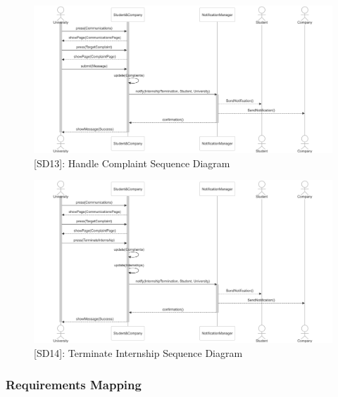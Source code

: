 \begin{figure}
    \centering
    \includegraphics[width=1\textwidth]{Latex/Images/RASD/SequenceDiagrams/HandleComplaintSequenceDiagram.png}
    \caption{[SD13]: Handle Complaint Sequence Diagram}
    \label{fig:SD13}
\end{figure}

\begin{figure}
    \centering
    \includegraphics[width=1\textwidth]{Latex/Images/RASD/SequenceDiagrams/TerminateInternshipSequenceDiagram.png}
    \caption{[SD14]: Terminate Internship Sequence Diagram}
    \label{fig:SD14}
\end{figure}
\clearpage

\subsubsection{Requirements Mapping}

